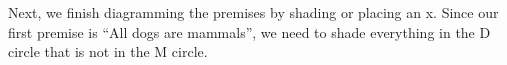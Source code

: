 


Next, we finish diagramming the premises by shading or placing an x. Since our first premise is \enquote{All dogs are mammals}, we need to shade everything in the D circle that is not in the M circle.


